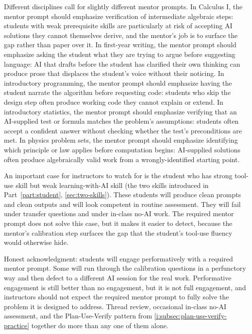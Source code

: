 \documentclass{SIAMbook2023}
\begin{document}
Different disciplines call for slightly different mentor prompts. In Calculus I, the mentor prompt should emphasize verification of intermediate algebraic steps: students with weak prerequisite skills are particularly at risk of accepting AI solutions they cannot themselves derive, and the mentor's job is to surface the gap rather than paper over it. In first-year writing, the mentor prompt should emphasize asking the student what they are trying to argue before suggesting language: AI that drafts before the student has clarified their own thinking can produce prose that displaces the student's voice without their noticing. In introductory programming, the mentor prompt should emphasize having the student narrate the algorithm before requesting code: students who skip the design step often produce working code they cannot explain or extend. In introductory statistics, the mentor prompt should emphasize verifying that an AI-supplied test or formula matches the problem's assumptions: students often accept a confident answer without checking whether the test's preconditions are met. In physics problem sets, the mentor prompt should emphasize identifying which principle or law applies before computation begins: AI-supplied solutions often produce algebraically valid work from a wrongly-identified starting point.

An important case for instructors to watch for is the student who has strong tool-use skill but weak learning-with-AI skill (the two skills introduced in Part~\ref{part:student}, \cref{sec:two-skills}). These students will produce clean prompts and clean outputs and will look competent in routine assessment. They will fail under transfer questions and under in-class no-AI work. The required mentor prompt does not solve this case, but it makes it easier to detect, because the mentor's calibration step surfaces the gap that the student's tool-use fluency would otherwise hide.

Honest acknowledgment: students will engage performatively with a required mentor prompt. Some will run through the calibration questions in a perfunctory way and then defect to a different AI session for the real work. Performative engagement is still better than no engagement, but it is not full engagement, and instructors should not expect the required mentor prompt to fully solve the problem it is designed to address. Thread review, occasional in-class no-AI assessment, and the Plan-Use-Verify pattern from \cref{i:subsec:plan-use-verify-practice} together do more than any one of them alone.
\end{document}

